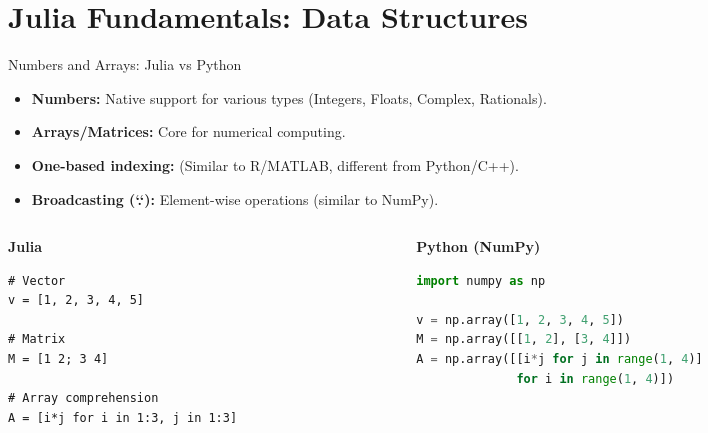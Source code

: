 \documentclass{beamer}
\begin{document}
\section{Julia Fundamentals: Data Structures}

\begin{frame}[fragile]{Numbers and Arrays: Julia vs Python}
\begin{itemize}
    \item \textbf{Numbers:} Native support for various types (Integers, Floats, Complex, Rationals).
    \item \textbf{Arrays/Matrices:} Core for numerical computing.
    \item \textbf{One-based indexing:} (Similar to R/MATLAB, different from Python/C++).
    \item \textbf{Broadcasting (`.`):} Element-wise operations (similar to NumPy).
\end{itemize}

\vspace{0.3cm}
\begin{columns}
    \begin{column}{0.5\textwidth}
    \textbf{Julia}
    \begin{lstlisting}
# Vector
v = [1, 2, 3, 4, 5]

# Matrix
M = [1 2; 3 4]

# Array comprehension
A = [i*j for i in 1:3, j in 1:3]
    \end{lstlisting}
    \end{column}

    \begin{column}{0.5\textwidth}
    \textbf{Python (NumPy)}
    \begin{lstlisting}[language=Python]
import numpy as np

v = np.array([1, 2, 3, 4, 5])
M = np.array([[1, 2], [3, 4]])
A = np.array([[i*j for j in range(1, 4)] 
              for i in range(1, 4)])
    \end{lstlisting}
    \end{column}
\end{columns}
\end{frame}
\end{document}
